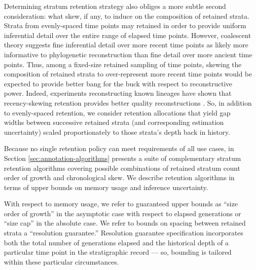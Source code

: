 Determining stratum retention strategy also obliges a more subtle second consideration: what skew, if any, to induce on the composition of retained strata.
Strata from evenly-spaced time points may retained in order to provide uniform inferential detail over the entire range of elapsed time points.
However, coalescent theory suggests fine inferential detail over more recent time points as likely more informative to phylogenetic reconstruction than fine detail over more ancient time points.
Thus, among a fixed-size retained sampling of time points, skewing the composition of retained strata to over-represent more recent time points would be expected to provide better bang for the buck with respect to reconstructive power.
Indeed, experiments reconstructing known lineages have shown that recency-skewing retention provides better quality reconstructions \citep{moreno2022hereditary}.
So, in addition to evenly-spaced retention, we consider retention allocations that yield gap widths between successive retained strata (and corresponding estimation uncertainty) scaled proportionately to those strata's depth back in history.

Because no single retention policy can meet requirements of all use cases, in Section \ref{sec:annotation-algorithms} presents a suite of complementary stratum retention algorithms covering possible combinations of retained stratum count order of growth and chronological skew.
We describe retention algorithms in terms of upper bounds on memory usage and inference uncertainty.

With respect to memory usage, we refer to guaranteed upper bounds as ``size order of growth'' in the asymptotic case with respect to elapsed generations or ``size cap'' in the absolute case.
We refer to bounds on spacing between retained strata a ``resolution guarantee.''
Resolution guarantee specification incorporates both the total number of generations elapsed and the historical depth of a particular time point in the stratigraphic record --- so, bounding is tailored within these particular circumstances.

